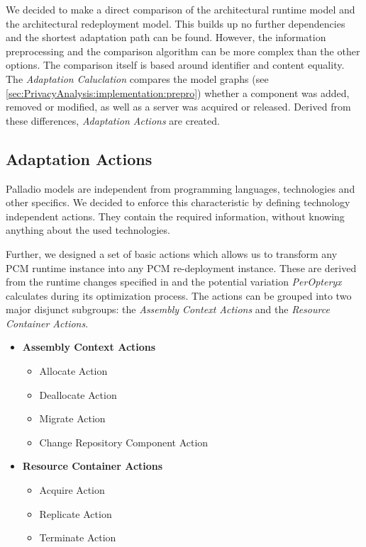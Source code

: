 We decided to make a direct comparison of the architectural runtime model and the architectural redeployment model. This builds up no further dependencies and the shortest adaptation path can be found. However, the information preprocessing and the comparison algorithm can be more complex than the other options. The comparison itself is based around identifier and content equality. The \textit{Adaptation Caluclation} compares the model graphs (see \autoref{sec:PrivacyAnalysis:implementation:prepro}) whether a component was added, removed or modified, as well as a server was acquired or released. Derived from these differences, \textit{Adaptation Actions} are created.


\subsection{Adaptation Actions}
Palladio models are independent from programming languages, technologies and other specifics. We decided to enforce this characteristic by defining technology independent actions. They contain the required information, without knowing anything about the used technologies.

Further, we designed a set of basic actions which allows us to transform any PCM runtime instance into any PCM re-deployment instance. These are derived from the runtime changes specified in \cite{Heinrich.2016b} and the potential variation \textit{PerOpteryx} calculates during its optimization process. The actions can be grouped into two major disjunct subgroups: the \textit{Assembly Context Actions} and the \textit{Resource Container Actions}.

\begin{itemize}
	\label{enum:SysAdap:plan:actions}
	\setlength\itemsep{0em}
	\item \textbf{Assembly Context Actions}
	\begin{itemize}
		\setlength\itemsep{0em}
		\item Allocate Action
		\item Deallocate Action
		\item Migrate Action
		\item Change Repository Component Action
	\end{itemize}
	\item \textbf{Resource Container Actions}
	\begin{itemize}
		\setlength\itemsep{0em}
		\item Acquire Action
		\item Replicate Action
		\item Terminate Action
	\end{itemize}
\end{itemize}

